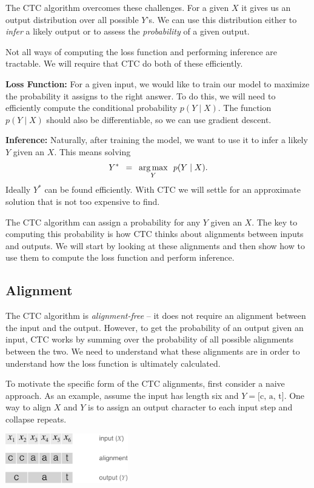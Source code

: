 The CTC algorithm overcomes these challenges. For a given $X$ it gives us an
output distribution over all possible $Y$'s. We can use this distribution
either to {\it infer} a likely output or to assess the {\it probability} of a
given output.

Not all ways of computing the loss function and performing inference are
tractable. We will require that CTC do both of these efficiently.

{\bf Loss Function:} For a given input, we would like to train our model to
maximize the probability it assigns to the right answer. To do this, we will
need to efficiently compute the conditional probability $p(Y \mid X)$. The
function $p(Y \mid X)$ should also be differentiable, so we can use gradient
descent.

{\bf Inference:} Naturally, after training the model, we want to use it to
infer a likely $Y$ given an $X$.  This means solving
\[
  Y^* \enspace =\enspace \operatorname*{arg\,max}_Y \enspace p(Y \mid X).
\]
Ideally $Y^*$ can be found efficiently. With CTC we will settle for an
approximate solution that is not too expensive to find.

The CTC algorithm can assign a probability for any $Y$ given an $X$. The key to
computing this probability is how CTC thinks about alignments between inputs
and outputs. We will start by looking at these alignments and then show how to
use them to compute the loss function and perform inference.

\subsection{Alignment}

The CTC algorithm is {\it alignment-free} -- it does not require an alignment
between the input and the output. However, to get the probability of an output
given an input, CTC works by summing over the probability of all possible
alignments between the two. We need to understand what these alignments are in
order to understand how the loss function is ultimately calculated.

To motivate the specific form of the CTC alignments, first consider a naive
approach. As an example, assume the input has length six and $Y = \textrm{[c,
a, t]}$. One way to align $X$ and $Y$ is to assign an output character to each
input step and collapse repeats.

\begin{center}
\includegraphics[width=0.4\textwidth]{background/figures/naive_alignment.pdf}
\end{center}

